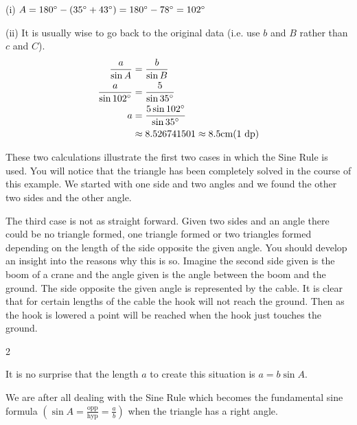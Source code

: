 (i) $A =180 \mbox{{\ensuremath{{}^\circ}}} -(35 \mbox{{\ensuremath{{}^\circ}}} +43 \mbox{{\ensuremath{{}^\circ}}}) =180 \mbox{{\ensuremath{{}^\circ}}} -78 \mbox{{\ensuremath{{}^\circ}}} =102 \mbox{{\ensuremath{{}^\circ}}}$ 

(ii) It is usually wise to go back to the original data (i.e. use $b$ and $B$ rather than $c$ and $C$).
\begin{align*}\frac{a}{\sin  A} &  = \frac{b}{\sin  B} \\
\frac{a}{\sin  102 \mbox{{\ensuremath{{}^\circ}}}} &  = \frac{5}{\sin  35 \mbox{{\ensuremath{{}^\circ}}}} \\
a &  = \frac{5 \sin  102 \mbox{{\ensuremath{{}^\circ}}}}{\sin  35 \mbox{{\ensuremath{{}^\circ}}}} \\
 &  \approx   8.526741501 \approx 8.5 \mbox{cm}\text{(1 dp)}\end{align*}

These two calculations
illustrate the first two cases in which the Sine Rule is used. You will notice that the triangle has been completely
solved in the course of this example. We started with one side and two angles and we found the other two sides
and the other angle. 

The third case is not as straight forward. Given two sides and an
angle there could be no triangle formed, one triangle formed or two triangles formed depending on the length of the side opposite the given angle. You should develop an insight into the reasons why
this is so. Imagine the second side given is the boom of a crane and the angle given is the angle between the
boom and the ground. The side opposite the given angle is represented by the cable. It is clear that for certain
lengths of the cable the hook will not reach the ground. Then as the hook is lowered a point will be reached
when the hook just touches the ground.  
\columnsep =30pt
\begin {multicols}{2}
 

   
\setlength\fboxrule{0in}\setlength\fboxsep{0.2in}


It is no surprise that the length $a$ to create this situation is $a =b \sin  A\text{.}$ 

We are after all dealing with the Sine Rule which becomes the fundamental sine formula $\left (\sin  A =\frac{\text{opp}}{\text{hyp}} =\frac{a}{b}\right )$ when the triangle has a right angle. 
\end {multicols}


